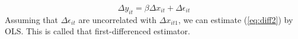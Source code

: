 \documentclass[landscape,letterpaper,9pt]{article}
\begin{document}
\begin{equation}\label{eq:diff2}
\Delta y_{it} =  \beta \Delta x_{it}  + \Delta \epsilon_{it}
\end{equation}
Assuming that \(\Delta \epsilon_{it}\) are uncorrelated with  \(\Delta x_{it1}\), we can estimate (\ref{eq:diff2}) by OLS.
This is called that first-differenced estimator.
%
%
%
%
%
%
%
%
%
%
\end{document}
